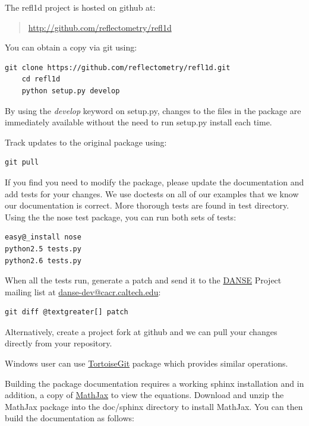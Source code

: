 \documentclass[letterpaper,10pt,english]{sphinxmanual}
\begin{document}
The refl1d project is hosted on github at:
\begin{quote}

\href{http://github.com/reflectometry/refl1d}{http://github.com/reflectometry/refl1d}
\end{quote}

You can obtain a copy via git using:

\begin{Verbatim}[commandchars=@\[\]]
git clone https://github.com/reflectometry/refl1d.git
    cd refl1d
    python setup.py develop
\end{Verbatim}

By using the \emph{develop} keyword on setup.py, changes to the files in the
package are immediately available without the need to run setup.py
install each time.

Track updates to the original package using:

\begin{Verbatim}[commandchars=@\[\]]
git pull
\end{Verbatim}

If you find you need to modify the package, please update the documentation
and add tests for your changes.  We use doctests on all of our examples
that we know our documentation is correct.  More thorough tests are found
in test directory.  Using the the nose test package, you can run both sets
of tests:

\begin{Verbatim}[commandchars=@\[\]]
easy@_install nose
python2.5 tests.py
python2.6 tests.py
\end{Verbatim}

When all the tests run, generate a patch and send it to the
\href{http://danse.us}{DANSE} Project mailing list at \href{mailto:danse-dev@cacr.caltech.edu}{danse-dev@cacr.caltech.edu}:

\begin{Verbatim}[commandchars=@\[\]]
git diff @textgreater[] patch
\end{Verbatim}

Alternatively, create a project fork at github and we can pull your
changes directly from your repository.

Windows user can use \href{http://code.google.com/p/tortoisegit/}{TortoiseGit}
package which provides similar operations.

Building the package documentation requires a working sphinx installation
and in addition, a copy of \href{http://www.mathjax.org/}{MathJax} to view
the equations.  Download and unzip the MathJax package into the doc/sphinx
directory to install MathJax.  You can then build the documentation as follows:
\end{document}
